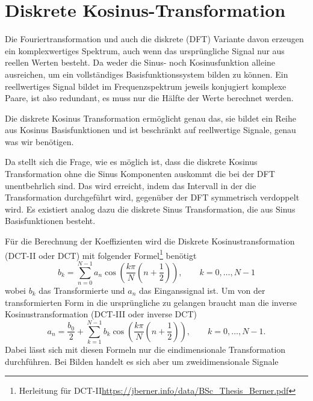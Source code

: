%
%
%
%
\section{Diskrete Kosinus-Transformation
\label{jpeg:section:dct}}
Die Fouriertransformation und auch die diskrete (DFT) Variante davon erzeugen ein komplexwertiges Spektrum, auch wenn das ursprüngliche Signal nur aus reellen Werten besteht.
Da weder die Sinus- noch Kosinusfunktion alleine ausreichen, um ein vollständiges Basisfunktionssystem bilden zu können.
Ein reellwertiges Signal bildet im Frequenzspektrum jeweils konjugiert komplexe Paare, ist also redundant, es muss nur die Hälfte der Werte berechnet werden.

Die diskrete Kosinus Transformation ermöglicht genau das, sie bildet ein Reihe aus Kosinus Basisfunktionen und ist beschränkt auf reellwertige Signale, genau was wir benötigen.

Da stellt sich die Frage, wie es möglich ist, dass die diskrete Kosinus Transformation ohne die Sinus Komponenten auskommt die bei der DFT unentbehrlich sind.
Das wird erreicht, indem das Intervall in der die Transformation durchgeführt wird, gegenüber der DFT symmetrisch verdoppelt wird.
Es existiert analog dazu die diskrete Sinus Transformation, die aus Sinus Basisfunktionen besteht.

Für die Berechnung der Koeffizienten wird die Diskrete Kosinustransformation (DCT-II oder DCT) mit folgender Formel\footnote{Herleitung für DCT-II\url{https://jberner.info/data/BSc_Thesis_Berner.pdf}} benötigt 
\begin{equation}
    b_k
    =
    \sum \limits_{n=0}^{N-1} a_n 
    \cos\left(
        \frac{k\pi}{N}\left(n + \frac{1}{2} \right) 
    \right),
    \qquad k = 0,\dots,N-1
\label{jpeg:equationdct2}
\end{equation}
wobei \(b_k\) das Transformierte und \(a_n\) das Einganssignal ist.
Um von der transformierten Form in die ursprüngliche zu gelangen braucht man die inverse Kosinustransformation (DCT-III oder inverse DCT)
\begin{equation}
    a_n
    =
    \frac{b_0}{2} +
    \sum \limits_{k=1}^{N-1} b_k 
    \cos\left(
    \frac{k\pi}{N}\left(n + \frac{1}{2} \right) 
    \right),
    \qquad k = 0,\dots,N-1.
    \label{jpeg:equationdct3}
\end{equation}
Dabei lässt sich mit diesen Formeln nur die eindimensionale Transformation durchführen.
Bei Bilden handelt es sich aber um zweidimensionale Signale

